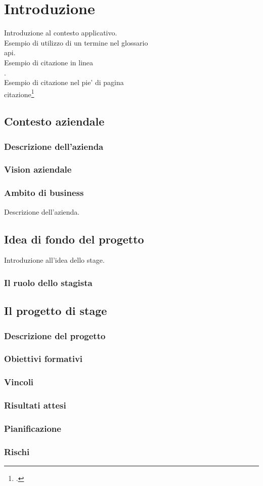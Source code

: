 \chapter{Introduzione}
\label{cap:introduzione}

Introduzione al contesto applicativo.\\

\noindent Esempio di utilizzo di un termine nel glossario \\
\gls{api}. \\

\noindent Esempio di citazione in linea \\
\cite{site:agile-manifesto}. \\

\noindent Esempio di citazione nel pie' di pagina \\
citazione\footcite{womak:lean-thinking} \\

\section{Contesto aziendale}
\subsection{Descrizione dell'azienda}
\subsection{Vision aziendale}
\subsection{Ambito di business}
Descrizione dell'azienda.

\section{Idea di fondo del progetto}

Introduzione all'idea dello stage.
\subsection{Il ruolo dello stagista}
\section{Il progetto di stage}
\subsection{Descrizione del progetto}
\subsection{Obiettivi formativi}
\subsection{Vincoli}
\subsection{Risultati attesi}
\subsection{Pianificazione}
\subsection{Rischi}

